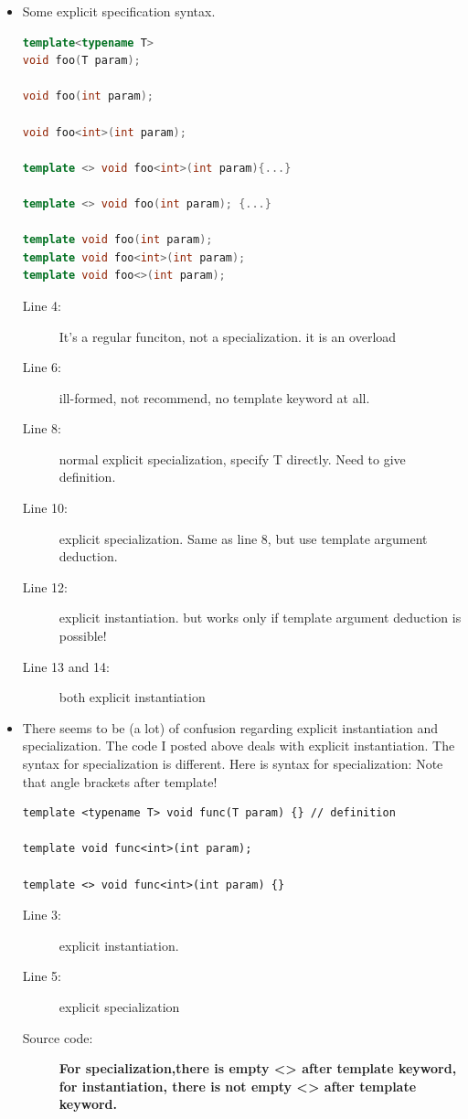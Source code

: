 \documentclass[a4paper,11pt,twoside]{book}
\begin{document}
\begin{itemize}
\item Some explicit specification syntax.
\begin{lstlisting}[frame=single, language=c++]
template<typename T>
void foo(T param);

void foo(int param);

void foo<int>(int param);

template <> void foo<int>(int param){...}

template <> void foo(int param); {...}

template void foo(int param);  
template void foo<int>(int param); 
template void foo<>(int param); 
\end{lstlisting}
\begin{description}
	\item[Line 4:] It's a regular funciton, not a specialization. it is an overload
	
	\item[Line 6:] ill-formed, not recommend, no template keyword at all.
	
	\item[Line 8:] normal explicit specialization, specify T directly. Need to give definition.
	
	\item[Line 10:] explicit specialization. Same as line 8, but use template argument deduction.
	
	\item[Line 12:] explicit instantiation. but works only if template argument deduction is possible!
	
	\item[Line 13 and 14:] both explicit instantiation
\end{description}

\item There seems to be (a lot) of confusion regarding explicit instantiation and specialization. The code I posted above deals with explicit instantiation. The syntax for specialization is different. Here is syntax for specialization: Note that angle brackets after template!

\begin{lstlisting}
template <typename T> void func(T param) {} // definition

template void func<int>(int param); 

template <> void func<int>(int param) {} 
\end{lstlisting}
\begin{description}
	\item[Line 3:] explicit instantiation.
	\item[Line 5:] explicit specialization
	\item[Source code:]\textbf{For specialization,there is empty <> after template keyword, for instantiation, there is not empty <> after template keyword.}
\end{description}

\end{itemize}
\end{document}

